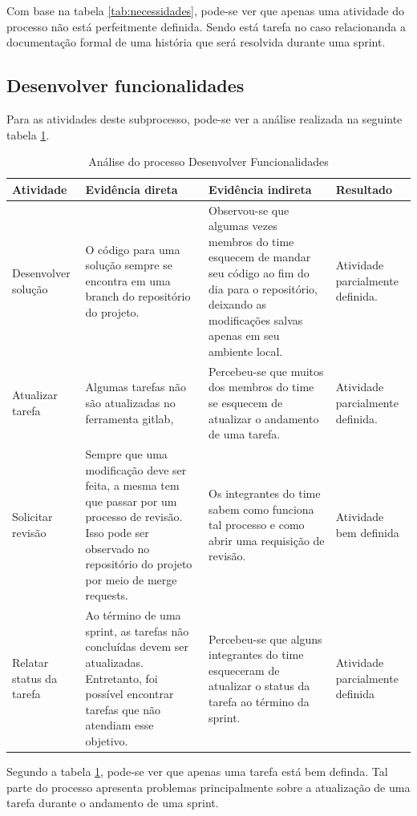 \documentclass[a4paper, 11pt]{article}
\begin{document}
Com base na tabela \ref{tab:necessidades}, pode-se ver que apenas uma atividade
do processo não está perfeitmente definida. Sendo está tarefa no caso
relacionanda a documentação formal de uma história que será resolvida durante
uma sprint.

\subsection*{Desenvolver funcionalidades}

Para as atividades deste subprocesso, pode-se ver a análise realizada na
seguinte tabela \ref{tab:desenvolvimento}.

\begin{table}[]
\centering
\caption{Análise do processo Desenvolver Funcionalidades}
\label{tab:desenvolvimento}
\begin{tabularx}{\textwidth}{|X|X|X|X|}
\hline
Atividade & Evidência direta & Evidência indireta & Resultado \\ \hline
Desenvolver solução & O código para uma solução sempre se encontra em uma branch do repositório do projeto. & Observou-se que algumas vezes membros do time esquecem de mandar seu código ao fim do dia para o repositório, deixando as modificações salvas apenas em seu ambiente local. & Atividade parcialmente definida. \\ \hline
Atualizar tarefa & Algumas tarefas não são atualizadas no ferramenta gitlab, & Percebeu-se que muitos dos membros do time se esquecem de atualizar o andamento de uma tarefa. & Atividade parcialmente definida. \\ \hline
Solicitar revisão & Sempre que uma modificação deve ser feita, a mesma tem que passar por um processo de revisão. Isso pode ser observado no repositório do projeto por meio de merge requests. & Os integrantes do time sabem como funciona tal processo e como abrir uma requisição de revisão. & Atividade bem definida \\ \hline
Relatar status da tarefa & Ao término de uma sprint, as tarefas não concluídas devem ser atualizadas. Entretanto, foi possível encontrar tarefas que não atendiam esse objetivo. & Percebeu-se que alguns integrantes do time esqueceram de atualizar o status da tarefa ao término da sprint. & Atividade parcialmente definida \\ \hline
\end{tabularx}
\end{table}

Segundo a tabela \ref{tab:desenvolvimento}, pode-se ver que apenas uma tarefa
está bem definda. Tal parte do processo apresenta problemas principalmente
sobre a atualização de uma tarefa durante o andamento de uma sprint.
\end{document}
